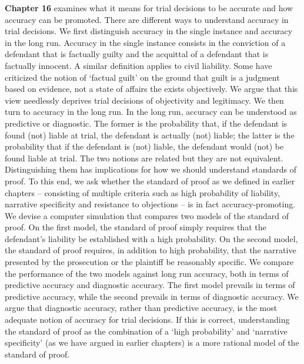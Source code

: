 \documentclass[
  10pt,
  dvipsnames,enabledeprecatedfontcommands]{scrartcl}
\newcommand{\raf}[1]{\todo[color=olive!40]{#1}}
\begin{document}
\textbf{Chapter 16} examines what it means for trial decisions to be
accurate and how accuracy can be promoted. There are different ways to
understand accuracy in trial decisions. We first distinguish accuracy in
the single instance and accuracy in the long run. Accuracy in the single
instance consists in the conviction of a defendant that is factually
guilty and the acquittal of a defendant that is factually innocent. A
similar definition applies to civil liability. Some have criticized the
notion of `factual guilt' on the ground that guilt is a judgment based
on evidence, not a state of affairs the exists objectively. We argue
that this view needlessly deprives trial decisions of objectivity and
legitimacy. We then turn to accuracy in the long run. In the long run,
accuracy can be understood as predictive or diagnostic. The former is
the probability that, if the defendant is found (not) liable at trial,
the defendant is actually (not) liable; the latter is the probability
that if the defendant is (not) liable, the defendant would (not) be
found liable at trial. The two notions are related but they are not
equivalent. Distinguishing them has implications for how we should
understand standards of proof. To this end, we ask whether the standard
of proof as we defined in earlier chapters -- consisting of multiple
criteria such as high probability of liability, narrative specificity
and resistance to objections -- is in fact accuracy-promoting. We devise
a computer simulation that compares two models of the standard of proof.
On the first model, the standard of proof simply requires that the
defendant's liability be established with a high probability. On the
second model, the standard of proof requires, in addition to high
probability, that the narrative presented by the prosecution or the
plaintiff be reasonably specific. We compare the performance of the two
models against long run accuracy, both in terms of predictive accuracy
and diagnostic accuracy. The first model prevails in terms of predictive
accuracy, while the second prevails in terms of diagnostic accuracy. We
argue that diagnostic accuracy, rather than predictive accuracy, is the
most adequate notion of accuracy for trial decisions. If this is
correct, understanding the standard of proof as the combination of a
`high probability' and `narrative specificity' (as we have argued in
earlier chapters) is a more rational model of the standard of proof.

\raf{M: Does this make sense? Anythign to add or remove?}
\end{document}
